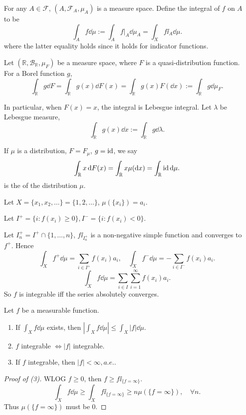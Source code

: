 For any $A\in \mathscr{F}$, $(A, \mathscr{F}_A, \mu_A)$ is a measure space.
Define  the integral of $f$ on $A$ to be
\[
\int_A f\dd \mu := \int_A f\big|_A \dd \mu_A = \int_X f\ii_A \dd \mu.
\]
where the latter equality holds since it holds for indicator functions.

\begin{example}
	Let $(\mathbb{R}, \mathscr{B}_{\mathbb{R}}, \mu_F)$ be a measure space,
	where $F$ is a quasi-distribution function.
	For a Borel function $g$,
	\[
	\int_{\mathbb{R}} g\dd F = \int_{\mathbb{R}} g(x)\dd F(x)
	= \int_{\mathbb{R}} g(x)F(\dd x) := \int_{\mathbb{R}}g\dd \mu_F.
	\]

	In particular, when $F(x) = x$, the integral is Lebesgue integral.
	Let $\lambda$ be Lebesgue measure,
	\[
	\int_{\mathbb{R}}g(x)\dd x := \int_{\mathbb{R}}g\dd \lambda.
	\]

	If $\mu$ is a distribution, $F = F_\mu$,  $g =\operatorname{id}$,
	we say
	\[
	\int_{\mathbb{R}} x\mathop{}\!\mathrm{d} F(x) = \int_{\mathbb{R}} x \mu(\mathop{}\!\mathrm{d} x)
	= \int_{\mathbb{R}} \operatorname{id} \mathop{}\!\mathrm{d} \mu.
	\]
	is the  of the distribution $\mu$.
\end{example}

\begin{example}
	Let $X = \{x_1,x_2,\dots\} = \{1,2,\dots\}$, $\mu(\{x_i\}) = a_i$.

	Let $I^+ = \{i: f(x_i) \ge 0\}, I^- = \{i: f(x_i) < 0\}$.

	Let $I^+_n = I^+ \cap \{1,\dots,n\}$, $f\ii_{I^+_n}$ is a non-negative simple
	function and converges to $f^+$.
	Hence
	\[
	\int_X f^+ \dd \mu = \sum_{i\in I^+} f(x_i) a_i,\quad
	\int_X f^- \dd \mu = - \sum_{i\in I^-} f(x_i)a_i.
	\]
	\[
	\int_X f\dd \mu = \sum_{i\in I} \sum_{i=1}^{\infty} f(x_i)a_i.
	\]
	So $f$ is integrable iff the series absolutely converges.
\end{example}

\begin{theorem}
	Let $f$ be a measurable function.
	\begin{enumerate}[(1)]
		\item If $\int_X f\dd \mu$ exists,
			then $|\int_X f\dd \mu|\le \int_X|f|\dd \mu$.
		\item $f$ integrable $\iff |f|$ integrable.
		\item If $f$ integrable, then $|f|<\infty, a.e.$.
    \end{enumerate}
\end{theorem}
\begin{proof}[Proof of (3)]
	WLOG $f\ge 0$, then $f\ge f\ii_{\{f=\infty\}}$.
	\[
	\int_X f\dd \mu \ge \int _X f\ii_{\{f=\infty\}}\ge n\mu(\{f=\infty\}),
	\quad \forall n.
	\]
	Thus $\mu(\{f=\infty\})$ must be $0$.
\end{proof}

